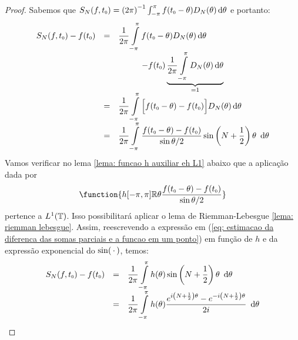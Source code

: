 \documentclass[../main.tex]{subfiles}
\begin{document}
\begin{teorema}
    \begin{proof}
        Sabemos que $S_N(f,\sub t0) = \inv{(2\pi)} \int_{-\pi}^\pi f(\sub t0 - \theta) D_N(\theta)\,\de\theta$ e portanto:
        \begin{equation}
            \label{eq: estimacao da diferenca das somas parciais e a funcao em um ponto}
            \begin{array}{rcl}
            S_N(f, \sub t0)  - f(\sub t0) &=& \displaystyle \dfrac{1}{2\pi} \int\limits_{-\pi}^\pi f(\sub t0 - \theta) D_N(\theta)\, \de\theta \\
            &  & \displaystyle \hspace{1cm}- f(\sub t0)\underbrace{\dfrac{1}{2\pi} \int\limits_{-\pi}^\pi  D_N(\theta)\,\de\theta}_{= 1}\\
                 &=& \displaystyle \dfrac{1}{2\pi} \int\limits_{-\pi}^\pi \Big[f(\sub t0 - \theta)- f(\sub t0)\Big]  D_N(\theta)\,\de\theta \\
                 & =& \displaystyle \dfrac{1}{2\pi} \int\limits_{-\pi}^\pi \dfrac{f(\sub t0 - \theta)- f(\sub t0)}{\sin \theta/2}  \sin \left(N+\frac12\right)\theta\,\,\,\de\theta \\
            \end{array}
        \end{equation}
        Vamos verificar no lema \ref{lema: funcao h auxiliar eh L1} abaixo que a aplicação dada por 
        \begin{equation}
            \label{eq: funcao h auxliar}
            \function{
            {h}{[-\pi, \pi]}{\mathbb R}{\theta}{\dfrac{f(\sub t0 - \theta)- f(\sub t0)}{\sin \theta/2}}
            }
        \end{equation}
        pertence a $L^1(\mathbb T)$. Isso possibilitará aplicar o lema de Riemman-Lebesgue \ref{lema: riemman lebesgue}. Assim, reescrevendo a expressão em (\ref{eq: estimacao da diferenca das somas parciais e a funcao em um ponto}) em função de $h$ e da expressão exponencial do $\sin(\operatorname{\,\cdot\,})$, temos:
        \begin{equation*}
        \begin{array}{rcl}
            S_N(f,\sub t0) - f(\sub t0) 
            &=& \displaystyle \dfrac{1}{2\pi} \int\limits_{-\pi}^\pi h(\theta) \sin \left(N+\frac12\right)\theta \,\,\,\de\theta  \\
            &=& \displaystyle \dfrac{1}{2\pi} \int\limits_{-\pi}^\pi h(\theta) \dfrac{e^{i\left(N+\frac12\right)\theta} - e^{-i\left(N+\frac12\right)\theta}}{2i} \,\,\,\de\theta  \\

\end{array}
\end{equation*}
\end{proof}
\end{teorema}
\end{document}
